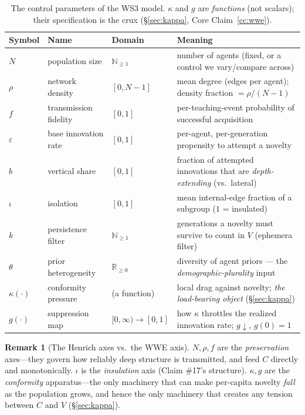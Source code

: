 \documentclass[11pt,letterpaper]{article}
\theoremstyle{definition}
\newtheorem{remark}{Remark}[section]
\theoremstyle{plain}
\newcommand{\Nat}{\mathbb{N}}
\newcommand{\Real}{\mathbb{R}}
\begin{document}
\begin{table}[h]
\centering
\small
\begin{tabular}{@{}l l l p{6.9cm}@{}}
\toprule
Symbol & Name & Domain & Meaning \\
\midrule
$N$ & population size & $\Nat_{\ge 1}$ & number of agents (fixed, or a control we vary/compare across) \\
$\rho$ & network density & $[0,N{-}1]$ & mean degree (edges per agent); density fraction $=\rho/(N{-}1)$ \\
$f$ & transmission fidelity & $[0,1]$ & per-teaching-event probability of successful acquisition \\
$\varepsilon$ & base innovation rate & $[0,1]$ & per-agent, per-generation propensity to attempt a novelty \\
$b$ & vertical share & $[0,1]$ & fraction of attempted innovations that are \emph{depth-extending} (vs.\ lateral) \\
$\iota$ & isolation & $[0,1]$ & mean internal-edge fraction of a subgroup ($1$ = insulated) \\
$k$ & persistence filter & $\Nat_{\ge 1}$ & generations a novelty must survive to count in $V$ (ephemera filter) \\
$\theta$ & prior heterogeneity & $\Real_{\ge 0}$ & diversity of agent priors --- the \emph{demographic-plurality} input \\
$\kappa(\cdot)$ & conformity pressure & (a function) & local drag against novelty; \emph{the load-bearing object} (\S\ref{sec:kappa}) \\
$g(\cdot)$ & suppression map & $[0,\infty)\!\to\![0,1]$ & how $\kappa$ throttles the realized innovation rate; $g\downarrow$, $g(0){=}1$ \\
\bottomrule
\end{tabular}
\caption{The control parameters of the WS3 model. $\kappa$ and $g$ are
\emph{functions} (not scalars); their specification is the crux
(\S\ref{sec:kappa}, Core Claim~\ref{cc:wwe}).}
\label{tab:params}
\end{table}

\begin{remark}[The Henrich axes vs.\ the WWE axis]
$N,\rho,f$ are the \emph{preservation} axes---they govern how reliably deep
structure is transmitted, and feed $C$ directly and monotonically. $\iota$ is the
\emph{insulation} axis (Claim \#17's structure). $\kappa,g$ are the
\emph{conformity} apparatus---the only machinery that can make per-capita novelty
\emph{fall} as the population grows, and hence the only machinery that creates
any tension between $C$ and $V$ (\S\ref{sec:kappa}).
\end{remark}
\end{document}
